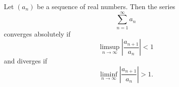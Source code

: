 \documentclass[12pt]{article}
\begin{document}
Let $(a_n)$ be a sequence of real numbers. Then the series
$$\sum_{n=1}^\infty a_n$$
converges absolutely if
$$\limsup_{n\to\infty} \left|\frac{a_{n+1}}{a_n}\right|<1$$ 
and diverges if
$$\liminf_{n\to\infty} \left|\frac{a_{n+1}}{a_n}\right|>1.$$
\end{document}
